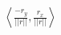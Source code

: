 \documentclass[preview]{standalone}
\begin{document}
\begin{align*}
\left\langle \frac{-r_y}{||r||},\frac{r_x}{||r||} \right\rangle
\end{align*}
\end{document}
